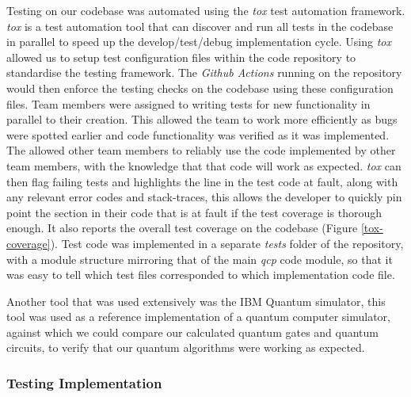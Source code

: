 \documentclass{article}
\begin{document}
Testing on our codebase was automated using the \textit{tox}\cite{noauthor_welcome_nodate} test automation framework.
\textit{tox} is a test automation tool that can discover and run all tests in the codebase in parallel to speed up the develop/test/debug implementation cycle. 
Using \textit{tox} allowed us to setup test configuration files within the code repository to standardise the testing framework. The \textit{Github Actions} running on the repository would then enforce the testing checks on the codebase using these configuration files. 
Team members were assigned to writing tests for new functionality in parallel to their creation. 
This allowed the team to work more efficiently as bugs were spotted earlier and code functionality was verified as it was implemented. 
The allowed other team members to reliably use the code implemented by other team members, with the knowledge that that code will work as expected. 
\textit{tox} can then flag failing tests and highlights the line in the test code at fault, along with any relevant error codes and stack-traces, this allows the developer to quickly pin point the section in their code that is at fault if the test coverage is thorough enough. 
It also reports the overall test coverage on the codebase (Figure \ref{tox-coverage}). 
Test code was implemented in a separate \textit{tests} folder of the repository, with a module structure mirroring that of the main \textit{qcp} code module, so that it was easy to tell which test files corresponded to which implementation code file.

\medskip

Another tool that was used extensively was the IBM Quantum simulator\cite{noauthor_programming_nodate}, this tool was used as a reference implementation of a quantum computer simulator, against which we could compare our calculated quantum gates and quantum circuits, to verify that our quantum algorithms were working as expected.

\subsubsection{\label{testing}Testing Implementation}
\end{document}
